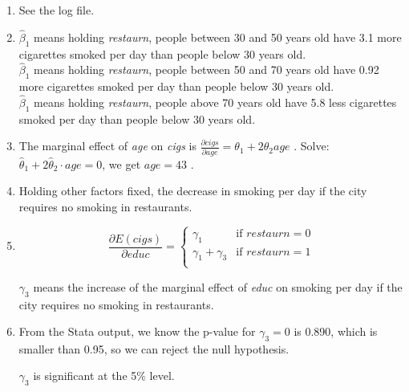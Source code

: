 \documentclass{article}
\begin{document}
\begin{enumerate}
\begin{enumerate}
        \item See the log file.
        \item $\hat{\beta}_1$ means holding \textit{restaurn}, people between 30 and 50 years old have 3.1 more cigarettes smoked per day than people below 30 years old. \\
        $\hat{\beta}_1$ means holding \textit{restaurn}, people between 50 and 70 years old have 0.92 more cigarettes smoked per day than people below 30 years old. \\
        $\hat{\beta}_1$ means holding \textit{restaurn}, people above 70 years old have 5.8 less cigarettes smoked per day than people below 30 years old. \\
        \item The marginal effect of \textit{age} on \textit{cigs} is $\frac{\partial \textit{cigs}}{\partial \textit{age}}=\theta_1+2\theta_2\textit{age}$ .
        Solve: $\hat{\theta}_1+2\hat{\theta}_2\cdot\textit{age}=0$, we get $\textit{age}=43$ .
        \item Holding other factors fixed, the decrease in smoking per day if the city requires no smoking in restaurants.
        \item \begin{equation}
            \frac{\partial E(\textit{cigs})}{\partial\textit{educ}}=\begin{cases}
                \gamma_1 & \text{if }\textit{restaurn}=0 \\
                \gamma_1+\gamma_3 & \text{if }\textit{restaurn}=1 \\
            \end{cases}
        \end{equation} \par
        $\gamma_3$ means the increase of the marginal effect of \textit{educ} on smoking per day if the city requires no smoking in restaurants.
        \item From the Stata output, we know the p-value for $\gamma_3=0$ is 0.890, which is smaller than 0.95, so we can reject the null hypothesis. \par
        $\gamma_3$ is significant at the 5\% level.
    \end{enumerate}
\end{enumerate}
\end{document}
